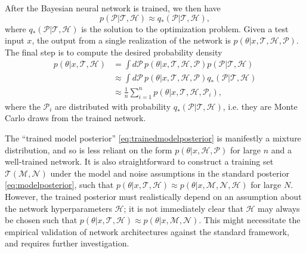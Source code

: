 \documentclass[aps,notitlepage,onecolumn]{revtex4-1}
\begin{document}
After the Bayesian neural network is trained, we then have
\begin{equation}
p(\mathcal{P}|\mathcal{T},\mathcal{H})\approx q_*(\mathcal{P}|\mathcal{T},\mathcal{H}),
\end{equation}
where $q_*(\mathcal{P}|\mathcal{T},\mathcal{H})$ is the solution to the optimization problem. Given a test input $x$, the output from a single realization of the network is $p(\theta|x,\mathcal{T},\mathcal{H},\mathcal{P})$. The final step is to compute the desired probability density
\begin{align}\label{eq:trainedmodelposterior}
p(\theta|x,\mathcal{T},\mathcal{H})&=\int d\mathcal{P}\,p(\theta|x,\mathcal{T},\mathcal{H},\mathcal{P})p(\mathcal{P}|\mathcal{T},\mathcal{H})\nonumber\\
&\approx\int d\mathcal{P}\,p(\theta|x,\mathcal{T},\mathcal{H},\mathcal{P})q_*(\mathcal{P}|\mathcal{T},\mathcal{H})\nonumber\\
&\approx\frac{1}{n}\sum_{i=1}^np(\theta|x,\mathcal{T},\mathcal{H},\mathcal{P}_i),
\end{align}
where the $\mathcal{P}_i$ are distributed with probability $q_*(\mathcal{P}|\mathcal{T},\mathcal{H})$, i.e. they are Monte Carlo draws from the trained network.

The ``trained model posterior'' \eqref{eq:trainedmodelposterior} is manifestly a mixture distribution, and so is less reliant on the form $p(\theta|x,\mathcal{H},\mathcal{P})$ for large $n$ and a well-trained network. It is also straightforward to construct a training set $\mathcal{T}(\mathcal{M},\mathcal{N})$ under the model and noise assumptions in the standard posterior \eqref{eq:modelposterior}, such that $p(\theta|x,\mathcal{T},\mathcal{H})\approx p(\theta|x,\mathcal{M},\mathcal{N},\mathcal{H})$ for large $N$. However, the trained posterior must realistically depend on an assumption about the network hyperparameters $\mathcal{H}$; it is not immediately clear that $\mathcal{H}$ may always be chosen such that $p(\theta|x,\mathcal{T},\mathcal{H})\approx p(\theta|x,\mathcal{M},\mathcal{N})$. This might necessitate the empirical validation of network architectures against the standard framework, and requires further investigation.
\end{document}
